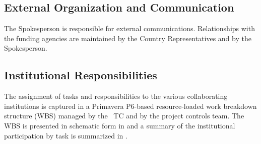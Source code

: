\subsection{External Organization and Communication}

The Spokesperson is responsible for external communications.  Relationships with the funding agencies are maintained by the Country Representatives and by the Spokesperson.


\subsection{Institutional Responsibilities}

The assignment of tasks and responsibilities to the various collaborating institutions is captured in a Primavera P6-based resource-loaded work breakdown structure (WBS) managed by the \DSks\ TC and by the project controls team. The WBS is presented in schematic form in  and a summary of the institutional participation by task is summarized in .

